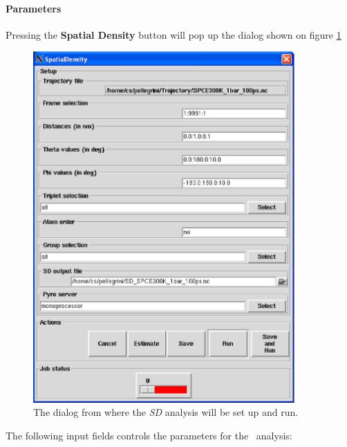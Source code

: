 \documentclass[a4paper,11pt]{report}
\begin{document}
\paragraph{Parameters\\}
\label{sd_parameters}
Pressing the \textbf{Spatial Density} button will pop up the dialog shown on figure \ref{fig:sd}
\begin{figure}[h!]
\begin{center}
\includegraphics[width=10cm]{Figures/sd.eps}
\end{center}
\caption[The \textit{SD} analysis dialog]{The dialog from where the \textit{SD} analysis will be set up and run.}
\label{fig:sd}
\end{figure}   

The following input fields controls the parameters for the \SD\ analysis:
\end{document}
